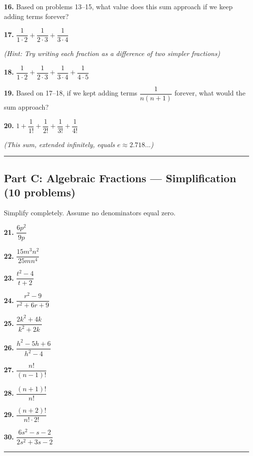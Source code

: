 \documentclass[
  11pt,
]{article}
\begin{document}
\textbf{16.} Based on problems 13--15, what value does this sum approach
if we keep adding terms forever?

\textbf{17.}
\(\dfrac{1}{1 \cdot 2} + \dfrac{1}{2 \cdot 3} + \dfrac{1}{3 \cdot 4}\)

\emph{(Hint: Try writing each fraction as a difference of two simpler
fractions)}

\textbf{18.}
\(\dfrac{1}{1 \cdot 2} + \dfrac{1}{2 \cdot 3} + \dfrac{1}{3 \cdot 4} + \dfrac{1}{4 \cdot 5}\)

\textbf{19.} Based on 17--18, if we kept adding terms
\(\dfrac{1}{n(n+1)}\) forever, what would the sum approach?

\textbf{20.}
\(1 + \dfrac{1}{1!} + \dfrac{1}{2!} + \dfrac{1}{3!} + \dfrac{1}{4!}\)

\emph{(This sum, extended infinitely, equals \(e \approx 2.718...\))}

\begin{center}\rule{0.5\linewidth}{0.5pt}\end{center}

\hypertarget{part-c-algebraic-fractions-simplification-10-problems}{%
\subsection{Part C: Algebraic Fractions --- Simplification (10
problems)}\label{part-c-algebraic-fractions-simplification-10-problems}}

Simplify completely. Assume no denominators equal zero.

\textbf{21.} \(\dfrac{6p^2}{9p}\)

\textbf{22.} \(\dfrac{15m^3n^2}{25mn^4}\)

\textbf{23.} \(\dfrac{t^2 - 4}{t + 2}\)

\textbf{24.} \(\dfrac{r^2 - 9}{r^2 + 6r + 9}\)

\textbf{25.} \(\dfrac{2k^2 + 4k}{k^2 + 2k}\)

\textbf{26.} \(\dfrac{h^2 - 5h + 6}{h^2 - 4}\)

\textbf{27.} \(\dfrac{n!}{(n-1)!}\)

\textbf{28.} \(\dfrac{(n+1)!}{n!}\)

\textbf{29.} \(\dfrac{(n+2)!}{n! \cdot 2!}\)

\textbf{30.} \(\dfrac{6s^2 - s - 2}{2s^2 + 3s - 2}\)

\begin{center}\rule{0.5\linewidth}{0.5pt}\end{center}
\end{document}
